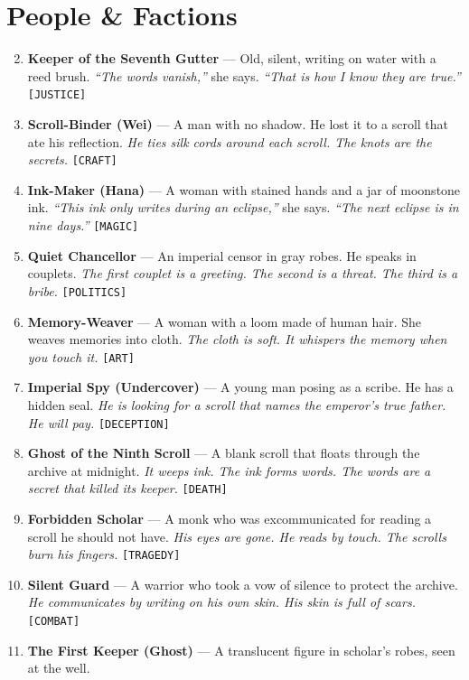 \section*{ People \& Factions}
\label{sec:lethai-thora-people}
\begin{enumerate}
\setcounter{enumi}{1}
\item \textbf{Keeper of the Seventh Gutter} --- Old, silent, writing on water with a reed brush.
  \hfill \textit{``The words vanish,''} she says. \textit{``That is how I know they are true.''} \texttt{[JUSTICE]}
\item \textbf{Scroll-Binder (Wei)} --- A man with no shadow. He lost it to a scroll that ate his reflection.
  \hfill \textit{He ties silk cords around each scroll. The knots are the secrets.} \texttt{[CRAFT]}
\item \textbf{Ink-Maker (Hana)} --- A woman with stained hands and a jar of moonstone ink.
  \hfill \textit{``This ink only writes during an eclipse,''} she says. \textit{``The next eclipse is in nine days.''} \texttt{[MAGIC]}
\item \textbf{Quiet Chancellor} --- An imperial censor in gray robes. He speaks in couplets.
  \hfill \textit{The first couplet is a greeting. The second is a threat. The third is a bribe.} \texttt{[POLITICS]}
\item \textbf{Memory-Weaver} --- A woman with a loom made of human hair. She weaves memories into cloth.
  \hfill \textit{The cloth is soft. It whispers the memory when you touch it.} \texttt{[ART]}
\item \textbf{Imperial Spy (Undercover)} --- A young man posing as a scribe. He has a hidden seal.
  \hfill \textit{He is looking for a scroll that names the emperor's true father. He will pay.} \texttt{[DECEPTION]}
\item \textbf{Ghost of the Ninth Scroll} --- A blank scroll that floats through the archive at midnight.
  \hfill \textit{It weeps ink. The ink forms words. The words are a secret that killed its keeper.} \texttt{[DEATH]}
\item \textbf{Forbidden Scholar} --- A monk who was excommunicated for reading a scroll he should not have.
  \hfill \textit{His eyes are gone. He reads by touch. The scrolls burn his fingers.} \texttt{[TRAGEDY]}
\item \textbf{Silent Guard} --- A warrior who took a vow of silence to protect the archive.
  \hfill \textit{He communicates by writing on his own skin. His skin is full of scars.} \texttt{[COMBAT]}
\item[J] \textbf{The First Keeper (Ghost)} --- A translucent figure in scholar's robes, seen at the well.

\end{enumerate}
